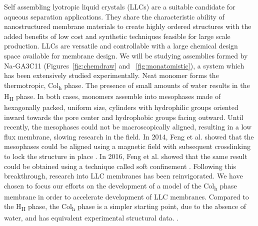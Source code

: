 Self assembling lyotropic liquid crystals (LLCs) are a suitable candidate
for aqueous separation applications. They share the characteristic
ability of nanostructured membrane materials to create highly ordered 
structures with the added benefits of low cost and synthetic techniques
feasible for large scale production\cite{feng_scalable_2014}. LLCs are
versatile and controllable with a large chemical design space available
for membrane design. We will be studying assemblies formed by Na-GA3C11 
(Figures~\ref{fig:chemdraw} and ~\ref{fig:monatomistic}), a system which
has been extensively studied experimentally\cite{smith_ordered_1997,
zhou_supported_2005,resel_h2-phase_2000,feng_scalable_2014,feng_thin_2016}. 
Neat monomer forms the thermotropic, Col\textsubscript{h} phase. The 
presence of small amounts of water results in the H\textsubscript{II} 
phase. In both cases, monomers assemble into mesophases made of 
hexagonally packed, uniform size, cylinders with hydrophilic groups oriented inward
towards the pore center and hydrophobic groups facing outward. Until
recently, the mesophases could not be macroscopically aligned, resulting
in a low flux membrane, slowing research in the field. In 2014, 
Feng et al. showed that the mesophases could be aligned using a magnetic
field with subsequent crosslinking to lock the structure in place
\cite{feng_scalable_2014}. In 2016, Feng et al. showed that the same 
result could be obtained using a technique called soft confinement
\cite{feng_thin_2016}. Following this breakthrough, research into LLC
membranes has been reinvigorated. We have chosen to focus our efforts 
on the development of a model of the Col\textsubscript{h} phase membrane
in order to accelerate development of LLC membranes.  Compared to the 
H\textsubscript{II} phase, the Col\textsubscript{h} phase is a simpler
starting point, due to the absence of water, and has equivalent 
experimental structural data. 
. 


